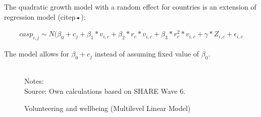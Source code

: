\documentclass[10pt, letterpaper]{article}
\begin{document}
\begin{spacing}{1.4}
The quadratic growth model with a random effect for countries is an extension of regression model (citep{•}):
 
\begin{eqnarray}
	casp_{i,j}\sim N(\beta_{0}+ c_{j} +  \beta_{1}*v_{i,c} + \beta_{2}*r_{c}*v_{i,c}+\beta_{3}*r^{2}_{c}*v_{i,c}+\gamma*Z_{i,c} + \epsilon_{i,c}
 \end{eqnarray}
 
 The model allows for $\beta_{0}+ c_{j}$ instead of assuming fixed value of $\beta_{0}$.   

\begin{figure}[H]
\centering
\caption{Volunteering and wellbeing (Multilevel Linear Model)} 
\label{fig:casp_ols}
\begin{minipage}{1\linewidth}
\quad
{} ~\\
{\footnotesize Notes: }~\\
{\footnotesize Source: Own calculations based on SHARE Wave 6.}
\end{minipage}
\end{figure}  
 

\end{spacing}
\end{document}
